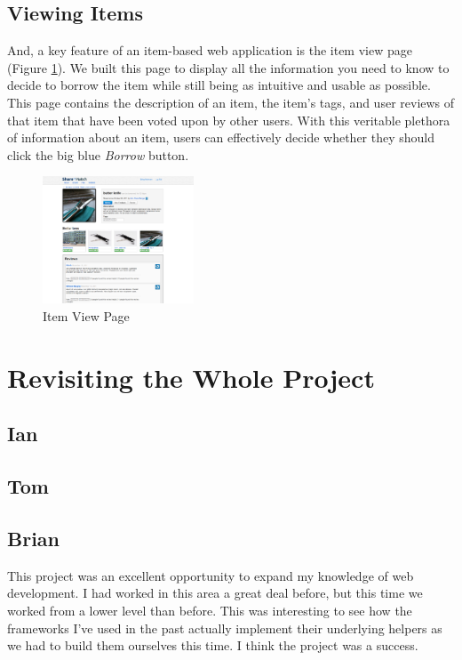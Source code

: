 \documentclass{acm_proc_article-sp}
\begin{document}
\subsection{Viewing Items}
And, a key feature of an item-based web application is the item view page (Figure \ref{fig:ItemView.png}). 
We built this page to display all the information
you need to know to decide to borrow the item while still being as intuitive and usable as possible. This page contains
the description of an item, the item's tags, and user reviews of that item that have been voted upon by other users.
With this veritable plethora of information about an item, users can effectively decide whether they should click the
big blue \textit{Borrow} button.

\begin{figure}[h]
\begin{centering}
\includegraphics[width=0.4\textwidth]{ItemView.png}
\caption{Item View Page}
\label{fig:ItemView.png}
\end{centering}
\end{figure}
\section{Revisiting the Whole Project}
\subsection{Ian}
\subsection{Tom}
\subsection{Brian}
This project was an excellent opportunity to expand my knowledge of web development.  I had worked in this area a great deal before, but this time we worked from a lower level than before.  This was interesting to see how the frameworks I've used in the past actually implement their underlying helpers as we had to build them ourselves this time.  I think the project was a success.
\end{document}
